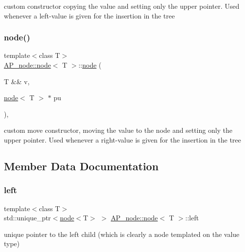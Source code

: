 custom constructor copying the value and setting only the upper pointer. Used whenever a left-\/value is given for the insertion in the tree \mbox{\label{structAP__node_1_1node_a548c79adaea5073dccf7283a7a511aac}} 
\subsubsection{\texorpdfstring{node()}{node()}\hspace{0.1cm}{\footnotesize\ttfamily [3/3]}}
{\footnotesize\ttfamily template$<$class T$>$ \\
\hyperlink{structAP__node_1_1node}{A\+P\+\_\+node\+::node}$<$ T $>$\+::\hyperlink{structAP__node_1_1node}{node} (\begin{DoxyParamCaption}\item[{T \&\&}]{v,  }\item[{\hyperlink{structAP__node_1_1node}{node}$<$ T $>$ $\ast$}]{pu }\end{DoxyParamCaption})\hspace{0.3cm}{\ttfamily [inline]}, {\ttfamily [noexcept]}}

custom move constructor, moving the value to the node and setting only the upper pointer. Used whenever a right-\/value is given for the insertion in the tree 

\subsection{Member Data Documentation}
\mbox{\label{structAP__node_1_1node_adde34e7c4d3d99dc9515c0c38e117e0a}} 
\subsubsection{\texorpdfstring{left}{left}}
{\footnotesize\ttfamily template$<$class T$>$ \\
std\+::unique\+\_\+ptr$<$\hyperlink{structAP__node_1_1node}{node}$<$T$>$ $>$ \hyperlink{structAP__node_1_1node}{A\+P\+\_\+node\+::node}$<$ T $>$\+::left}

unique pointer to the left child (which is clearly a node templated on the value type) \mbox{\label{structAP__node_1_1node_ab55fa203db8ddff7144bb2e4c1a336fc}} 
